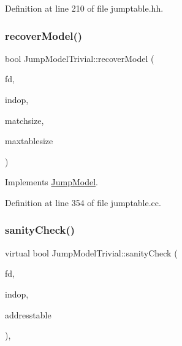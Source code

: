 Definition at line 210 of file jumptable.\+hh.

\mbox{\label{class_jump_model_trivial_ae05a183588550bc9102e12c80d7124b5}} 
\subsubsection{\texorpdfstring{recoverModel()}{recoverModel()}}
{\footnotesize\ttfamily bool Jump\+Model\+Trivial\+::recover\+Model (\begin{DoxyParamCaption}\item[{\mbox{\hyperlink{class_funcdata}{Funcdata}} $\ast$}]{fd,  }\item[{\mbox{\hyperlink{class_pcode_op}{Pcode\+Op}} $\ast$}]{indop,  }\item[{uint4}]{matchsize,  }\item[{uint4}]{maxtablesize }\end{DoxyParamCaption})\hspace{0.3cm}{\ttfamily [virtual]}}



Implements \mbox{\hyperlink{class_jump_model_a9c2326278dd18c9d78dd5cd5795e802b}{Jump\+Model}}.



Definition at line 354 of file jumptable.\+cc.

\mbox{\label{class_jump_model_trivial_a68d3e47c3ec7554f8a7d6800017d2ead}} 
\subsubsection{\texorpdfstring{sanityCheck()}{sanityCheck()}}
{\footnotesize\ttfamily virtual bool Jump\+Model\+Trivial\+::sanity\+Check (\begin{DoxyParamCaption}\item[{\mbox{\hyperlink{class_funcdata}{Funcdata}} $\ast$}]{fd,  }\item[{\mbox{\hyperlink{class_pcode_op}{Pcode\+Op}} $\ast$}]{indop,  }\item[{vector$<$ \mbox{\hyperlink{class_address}{Address}} $>$ \&}]{addresstable }\end{DoxyParamCaption})\hspace{0.3cm}{\ttfamily [inline]}, {\ttfamily [virtual]}}



